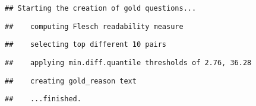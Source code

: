 \documentclass[]{article}
\newenvironment{Shaded}{\begin{snugshade}}{\end{snugshade}}
\newcommand{\CommentTok}[1]{\textcolor[rgb]{0.56,0.35,0.01}{\textit{#1}}}
\newcommand{\OperatorTok}[1]{\textcolor[rgb]{0.81,0.36,0.00}{\textbf{#1}}}
\newcommand{\NormalTok}[1]{#1}
\begin{document}
\begin{verbatim}
## Starting the creation of gold questions...
\end{verbatim}

\begin{verbatim}
##    computing Flesch readability measure
\end{verbatim}

\begin{verbatim}
##    selecting top different 10 pairs
\end{verbatim}

\begin{verbatim}
##    applying min.diff.quantile thresholds of 2.76, 36.28
\end{verbatim}

\begin{verbatim}
##    creating gold_reason text
\end{verbatim}

\begin{verbatim}
##    ...finished.
\end{verbatim}

\begin{Shaded}
\end{Shaded}
\end{document}

